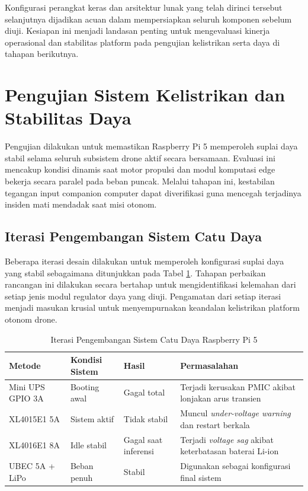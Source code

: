Konfigurasi perangkat keras dan arsitektur lunak yang telah dirinci tersebut selanjutnya dijadikan acuan dalam mempersiapkan seluruh komponen sebelum diuji. Kesiapan ini menjadi landasan penting untuk mengevaluasi kinerja operasional dan stabilitas platform pada pengujian kelistrikan serta daya di tahapan berikutnya.

\section{Pengujian Sistem Kelistrikan dan Stabilitas Daya}

Pengujian dilakukan untuk memastikan Raspberry Pi 5 memperoleh suplai daya stabil selama seluruh subsistem drone aktif secara bersamaan. Evaluasi ini mencakup kondisi dinamis saat motor propulsi dan modul komputasi edge bekerja secara paralel pada beban puncak. Melalui tahapan ini, kestabilan tegangan input companion computer dapat diverifikasi guna mencegah terjadinya insiden mati mendadak saat misi otonom.

\subsection{Iterasi Pengembangan Sistem Catu Daya}

Beberapa iterasi desain dilakukan untuk memperoleh konfigurasi suplai daya yang stabil sebagaimana ditunjukkan pada Tabel \ref{tab:iterasi_daya}. Tahapan perbaikan rancangan ini dilakukan secara bertahap untuk mengidentifikasi kelemahan dari setiap jenis modul regulator daya yang diuji. Pengamatan dari setiap iterasi menjadi masukan krusial untuk menyempurnakan keandalan kelistrikan platform otonom drone.

\begin{table}[H]
	\centering
	\caption{Iterasi Pengembangan Sistem Catu Daya Raspberry Pi 5}
	\label{tab:iterasi_daya}
	\renewcommand{\arraystretch}{1.2}
	\begin{tabular}{|p{3cm}|p{3cm}|p{3cm}|p{5cm}|}
		\hline
		Metode & Kondisi Sistem & Hasil & Permasalahan \\ \hline
		
		Mini UPS GPIO 3A &
		Booting awal &
		Gagal total &
		Terjadi kerusakan PMIC akibat lonjakan arus transien \\ \hline
		
		XL4015E1 5A &
		Sistem aktif &
		Tidak stabil &
		Muncul \textit{under-voltage warning} dan restart berkala \\ \hline
		
		XL4016E1 8A &
		Idle stabil &
		Gagal saat inferensi &
		Terjadi \textit{voltage sag} akibat keterbatasan baterai Li-ion \\ \hline
		
		UBEC 5A + LiPo &
		Beban penuh &
		Stabil &
		Digunakan sebagai konfigurasi final sistem \\ \hline
	\end{tabular}
\end{table}

